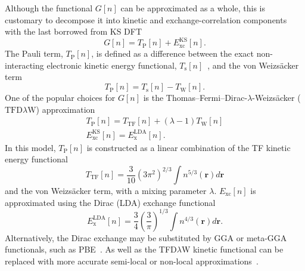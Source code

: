 \documentclass[%
 reprint,
 amsmath,amssymb,
 aps,
pra,
]{revtex4-2}
\begin{document}
Although the functional $G[n]$ can be approximated as a whole, this is customary to decompose it into kinetic and exchange-correlation components with the last borrowed from KS DFT~\cite{Staroverov.2012.Matter} 
\begin{equation}
    G[n]
    =
    T_{\text{P}}[n]
    +
    E^{\text{KS}}_{\text{xc}}[n].
\end{equation}
The Pauli term, $T_{\text{P}}[n]$, is defined as a difference between the exact non-interacting electronic kinetic energy functional, $T_{\text{s}}[n]$~\cite{Parr.1989.density}, and the von Weizsäcker term
\begin{equation}\label{eq: Pauli Term}
    T_{\text{P}}[n]
    =
    T_{\text{s}}[n]
    -
    T_{\text{W}}[n].
\end{equation} 
One of the popular choices for $G[n]$ is the Thomas--Fermi--Dirac-$\lambda$-Weizsäcker ($\text{TFD}\lambda \text{W}$) approximation~\cite{Karasiev.2012.CPC.183.2519, Chan.2001.JCP.114.631, Tomishima.1966.JPSJ.21.142, Yang.1986.PRA.34.4586} 
\begin{gather}\label{eq: TFDLW}
    T_{\text{P}}[n]
    =
    T_{\text{TF}}[n]
    +
    (\lambda - 1)
    T_{\text{W}}[n]\\[8pt]
    E_{\text{xc}}^{\text{KS}}[n]
    =
    E_{\text{x}}^{\text{LDA}}[n].
\end{gather}
In this model, $T_{\text{P}}[n]$ is constructed as a linear combination of the TF kinetic energy functional~\cite{Thomas.1927.MPCPC.5.542, Fermi.1927.RANL.6.602}
\begin{equation}\label{eq: TF}
    T_{\text{TF}}[n]
    =
    \frac{3}{10}\left(3\pi^2\right)^{2/3}
    \int n^{5/3}(\textbf{r})
    d\textbf{r}
\end{equation}
and the von Weizsäcker term, with a mixing parameter $\lambda$. $E_{\text{xc}}[n]$ is approximated using the Dirac (LDA) exchange functional~\cite{Dirac.1930.MPCPS.26.376}
\begin{equation}\label{eq: LDA exchange}
    E_{\text{x}}^{\text{LDA}}[n]
    =
    \frac{3}{4}\left(\frac{3}{\pi}\right)^{1/3}
    \int n^{4/3}(\textbf{r})
    d\textbf{r}.
\end{equation}
Alternatively, the Dirac exchange may be substituted by GGA or meta-GGA functionals, such as PBE~\cite{Perdew.1996.PRL.77.3865, Perdew.1997.PRL.78.1396}. As well as the TFD$\lambda$W kinetic functional can be replaced with more accurate semi-local or non-local approximations~\cite{Karasiev.2012.CPC.183.2519, Mi.2023.CR.123.12039}. 
\end{document}
